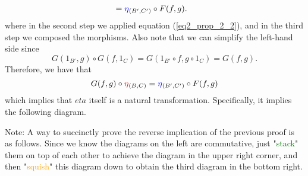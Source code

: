 \begin{prf}
\begin{description}
\begin{align*}
                &=\textcolor{blue}{\eta}_{(B',C')} \circ F(f, g).
            \end{align*}
            where in the second step we applied equation 
            (\ref{eq2_prop_2_2}), and in the third step we composed
            the morphisms. Also note that we can simplify the left-hand
            side since 
            \[ 
                G(1_{B'}, g)\circ G(f, 1_C) =
            G(1_{B'}\circ f, g \circ 1_C) = G(f, g).
            \] Therefore, we have that 
            \[
                G(f, g) \circ \textcolor{red}{\eta}_{(B, C)} = \textcolor{blue}{\eta}_{(B', C')} \circ F(f, g) 
            \]
            which implies that $eta$ itself is a natural
            transformation. Specifically, it implies the following
            diagram. 
            \begin{center}
                \hspace{2cm}
            \end{center}
        \end{description}
    \end{prf}
    Note: A way to succinctly prove the
    reverse implication of the previous proof is as follows. Since we
    know the diagrams on the left are commutative, just "\textcolor{Green}{stack}" them
    on top of each other to achieve the diagram in the upper right
    corner, and then "\textcolor{Orange}{squish}" this diagram down to obtain the third
    diagram in the bottom right. 
    
